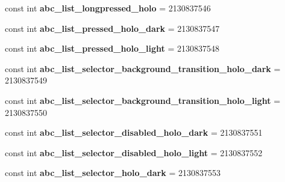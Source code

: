 \begin{DoxyCompactItemize}
\item 
\mbox{\label{classXaria_1_1Resource_1_1Drawable_ade5bde3896706029a7f5ee8711aea487}} 
const int {\bfseries abc\+\_\+list\+\_\+longpressed\+\_\+holo} = 2130837546
\item 
\mbox{\label{classXaria_1_1Resource_1_1Drawable_aa3c4ca01560b3565548afe5aa1e318f9}} 
const int {\bfseries abc\+\_\+list\+\_\+pressed\+\_\+holo\+\_\+dark} = 2130837547
\item 
\mbox{\label{classXaria_1_1Resource_1_1Drawable_ae65e4b4af9f10fab8b5f25b9acb08b07}} 
const int {\bfseries abc\+\_\+list\+\_\+pressed\+\_\+holo\+\_\+light} = 2130837548
\item 
\mbox{\label{classXaria_1_1Resource_1_1Drawable_a0f0f88fd7f8620d515dbaa794b4e534f}} 
const int {\bfseries abc\+\_\+list\+\_\+selector\+\_\+background\+\_\+transition\+\_\+holo\+\_\+dark} = 2130837549
\item 
\mbox{\label{classXaria_1_1Resource_1_1Drawable_a3a9c6375548639c57609670006f940a8}} 
const int {\bfseries abc\+\_\+list\+\_\+selector\+\_\+background\+\_\+transition\+\_\+holo\+\_\+light} = 2130837550
\item 
\mbox{\label{classXaria_1_1Resource_1_1Drawable_aadfa8f45e2fec676ee0794703a60f439}} 
const int {\bfseries abc\+\_\+list\+\_\+selector\+\_\+disabled\+\_\+holo\+\_\+dark} = 2130837551
\item 
\mbox{\label{classXaria_1_1Resource_1_1Drawable_acd87ac412ac3619b5284826adb0151d6}} 
const int {\bfseries abc\+\_\+list\+\_\+selector\+\_\+disabled\+\_\+holo\+\_\+light} = 2130837552
\item 
\mbox{\label{classXaria_1_1Resource_1_1Drawable_afef25dec1b0f7b31d81cb47d5ba725c4}} 
const int {\bfseries abc\+\_\+list\+\_\+selector\+\_\+holo\+\_\+dark} = 2130837553
\item 
\mbox{\label{classXaria_1_1Resource_1_1Drawable_abd0cf2f7211499278b999ab1b86d15dd}} 

\end{DoxyCompactItemize}
